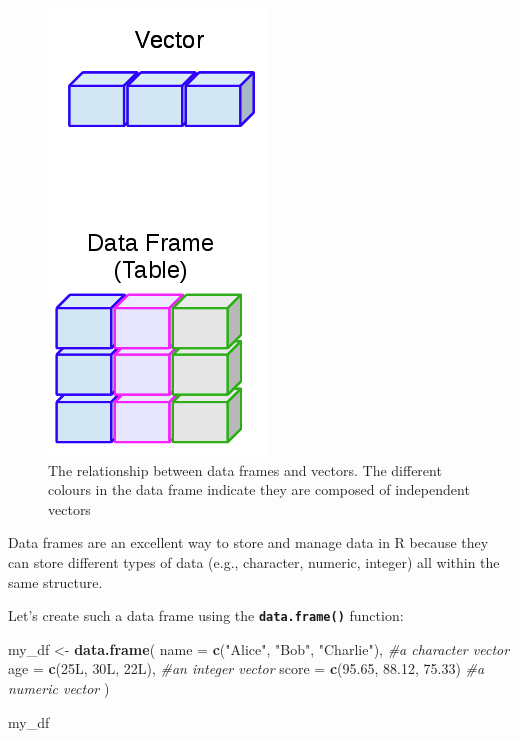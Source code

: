 \documentclass[
]{book}
\newenvironment{Shaded}{\begin{snugshade}}{\end{snugshade}}
\newcommand{\AttributeTok}[1]{\textcolor[rgb]{0.13,0.29,0.53}{#1}}
\newcommand{\CommentTok}[1]{\textcolor[rgb]{0.56,0.35,0.01}{\textit{#1}}}
\newcommand{\DataTypeTok}[1]{\textcolor[rgb]{0.13,0.29,0.53}{#1}}
\newcommand{\DecValTok}[1]{\textcolor[rgb]{0.00,0.00,0.81}{#1}}
\newcommand{\FloatTok}[1]{\textcolor[rgb]{0.00,0.00,0.81}{#1}}
\newcommand{\FunctionTok}[1]{\textcolor[rgb]{0.13,0.29,0.53}{\textbf{#1}}}
\newcommand{\NormalTok}[1]{#1}
\newcommand{\OtherTok}[1]{\textcolor[rgb]{0.56,0.35,0.01}{#1}}
\newcommand{\StringTok}[1]{\textcolor[rgb]{0.31,0.60,0.02}{#1}}
\begin{document}
\begin{figure}
\centering
\includegraphics{img/03-dataframes_vectors.png}
\caption{\label{fig:unnamed-chunk-83}The relationship between data frames and vectors. The different colours in the data frame indicate they are composed of independent vectors}
\end{figure}

Data frames are an excellent way to store and manage data in R because they can store different types of data (e.g., character, numeric, integer) all within the same structure.

Let's create such a data frame using the \textbf{\texttt{data.frame()}} function:

\begin{Shaded}
\begin{Highlighting}[]
\NormalTok{my\_df }\OtherTok{\textless{}{-}} \FunctionTok{data.frame}\NormalTok{(}
  \AttributeTok{name =} \FunctionTok{c}\NormalTok{(}\StringTok{"Alice"}\NormalTok{, }\StringTok{"Bob"}\NormalTok{, }\StringTok{"Charlie"}\NormalTok{), }\CommentTok{\#a character vector}
  \AttributeTok{age =} \FunctionTok{c}\NormalTok{(}\DecValTok{25}\DataTypeTok{L}\NormalTok{, }\DecValTok{30}\DataTypeTok{L}\NormalTok{, }\DecValTok{22}\DataTypeTok{L}\NormalTok{), }\CommentTok{\#an integer vector}
  \AttributeTok{score =} \FunctionTok{c}\NormalTok{(}\FloatTok{95.65}\NormalTok{, }\FloatTok{88.12}\NormalTok{, }\FloatTok{75.33}\NormalTok{) }\CommentTok{\#a numeric vector}
\NormalTok{)}

\NormalTok{my\_df}
\end{Highlighting}
\end{Shaded}
\end{document}
